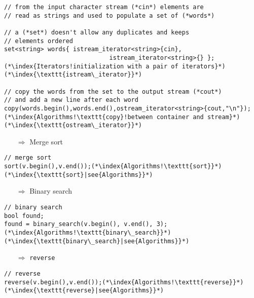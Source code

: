 \documentclass[10pt]{article}
\begin{document}
\begin{lstlisting}
// from the input character stream (*cin*) elements are 
// read as strings and used to populate a set of (*words*)

// a (*set*) doesn't allow any duplicates and keeps
// elements ordered
set<string> words{ istream_iterator<string>{cin},
                             istream_iterator<string>{} };(*\index{Iterators!initialization with a pair of iterators}*)(*\index{\texttt{istream\_iterator}}*)
                             
// copy the words from the set to the output stream (*cout*)
// and add a new line after each word
copy(words.begin(),words.end(),ostream_iterator<string>{cout,"\n"});(*\index{Algorithms!\texttt{copy}!between container and stream}*)(*\index{\texttt{ostream\_iterator}}*)
\end{lstlisting}
\begin{enumerate}
\item[$\Rightarrow$] Merge sort
\end{enumerate}
\begin{lstlisting}
// merge sort
sort(v.begin(),v.end());(*\index{Algorithms!\texttt{sort}}*)(*\index{\texttt{sort}|see{Algorithms}}*)
\end{lstlisting}
\begin{enumerate}
\item[$\Rightarrow$] Binary search
\end{enumerate}
\begin{lstlisting}
// binary search
bool found;
found = binary_search(v.begin(), v.end(), 3);(*\index{Algorithms!\texttt{binary\_search}}*)(*\index{\texttt{binary\_search}|see{Algorithms}}*)
\end{lstlisting}
\begin{enumerate}
\item[$\Rightarrow$] \texttt{reverse}
\end{enumerate}
\begin{lstlisting}
// reverse
reverse(v.begin(),v.end());(*\index{Algorithms!\texttt{reverse}}*)(*\index{\texttt{reverse}|see{Algorithms}}*)
\end{lstlisting}
%
%
\end{document}
